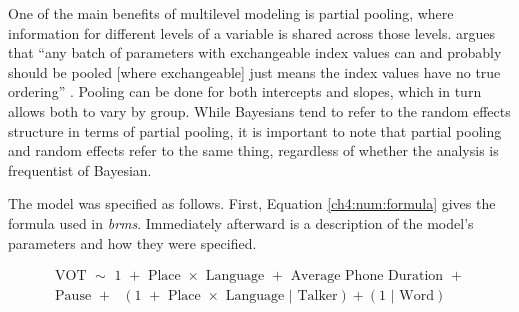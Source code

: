One of the main benefits of multilevel modeling is partial pooling, where information for different levels of a variable is shared across those levels. \citeauthor{mcelreath_2020_sr} argues that ``any batch of parameters with exchangeable index values can and probably should be pooled [where exchangeable] just means the index values have no true ordering'' \citeyearpar[][p. 435]{mcelreath_2020_sr}. Pooling can be done for both intercepts and slopes, which in turn allows both to vary by group. While Bayesians tend to refer to the random effects structure in terms of partial pooling, it is important to note that partial pooling and random effects refer to the same thing, regardless of whether the analysis is frequentist of Bayesian. 

The model was specified as follows. First, Equation \ref{ch4:num:formula} gives the formula used in \textit{brms}. Immediately afterward is a description of the model's parameters and how they were specified. 

\begin{equation}
  \begin{aligned}\label{ch4:num:formula}
    \text{VOT } \sim \text{ 1 } + \text{ Place } \times \text{ Language } + \text{ Average Phone Duration } + \\ 
    \text{Pause } + \text{ } (\text{1 } + \text{ Place } \times \text{ Language }|\text{ Talker}) + (\text{1 }| \text{ Word})
  \end{aligned}
\end{equation}\vspace{3pt}

